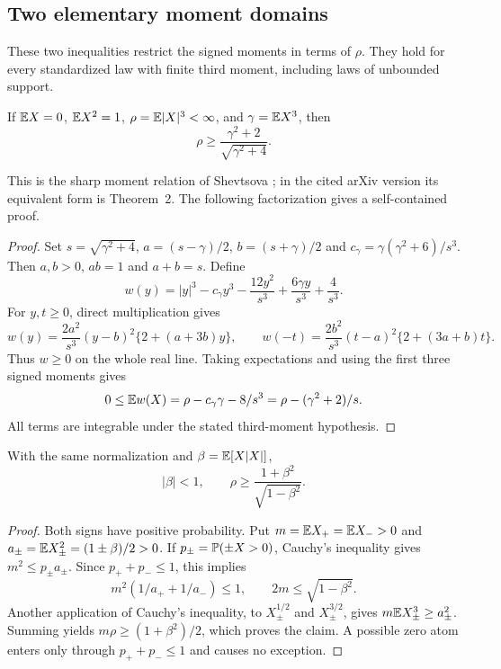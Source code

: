 \subsection{Two elementary moment domains}\label{ms:moment-domain}

These two inequalities restrict the signed moments in terms of $\rho$.
They hold for every standardized law with finite third moment, including
laws of unbounded support.

\begin{theorem}\label{ms:sharp-third}
If $\mathbb E X=0$, $\mathbb E X^2=1$, $\rho=\mathbb E|X|^3<\infty$, and
$\gamma=\mathbb E X^3$, then
\[
 \rho\ge\frac{\gamma^2+2}{\sqrt{\gamma^2+4}}.
\]
\end{theorem}
This is the sharp moment relation of Shevtsova
\cite{shevtsova2014complex}; in the cited arXiv version its equivalent
form is Theorem~2. The following factorization gives a self-contained proof.
\begin{proof}
Set $s=\sqrt{\gamma^2+4}$, $a=(s-\gamma)/2$, $b=(s+\gamma)/2$ and
$c_\gamma=\gamma(\gamma^2+6)/s^3$. Then $a,b>0$, $ab=1$ and $a+b=s$.
Define
\[
 w(y)=|y|^3-c_\gamma y^3-\frac{12y^2}{s^3}
                          +\frac{6\gamma y}{s^3}+\frac4{s^3}.
\]
For $y,t\ge0$, direct multiplication gives
\[
 w(y)=\frac{2a^2}{s^3}(y-b)^2\{2+(a+3b)y\},\qquad
 w(-t)=\frac{2b^2}{s^3}(t-a)^2\{2+(3a+b)t\}.
\]
Thus $w\ge0$ on the whole real line. Taking expectations and using the
first three signed moments gives
\[
 0\le\mathbb E w(X)=\rho-c_\gamma\gamma-8/s^3
            =\rho-(\gamma^2+2)/s.
\]
All terms are integrable under the stated third-moment hypothesis.
\end{proof}

\begin{lemma}\label{ms:sign-moment}
With the same normalization and $\beta=\mathbb E[X|X|]$,
\[
 |\beta|<1,\qquad
 \rho\ge\frac{1+\beta^2}{\sqrt{1-\beta^2}}.
\]
\end{lemma}
\begin{proof}
Both signs have positive probability. Put
$m=\mathbb E X_+=\mathbb E X_->0$ and $a_\pm=\mathbb E X_\pm^2=(1\pm\beta)/2>0$.
If $p_\pm=\mathbb P(\pm X>0)$, Cauchy's inequality gives
$m^2\le p_\pm a_\pm$. Since $p_++p_-\le1$, this implies
\[
 m^2(1/a_++1/a_-)\le1,
 \qquad 2m\le\sqrt{1-\beta^2}.
\]
Another application of Cauchy's inequality, to
$X_\pm^{1/2}$ and $X_\pm^{3/2}$, gives
$m\mathbb E X_\pm^3\ge a_\pm^2$. Summing yields
$m\rho\ge(1+\beta^2)/2$, which proves the claim. A possible zero atom
enters only through $p_++p_-\le1$ and causes no exception.
\end{proof}
